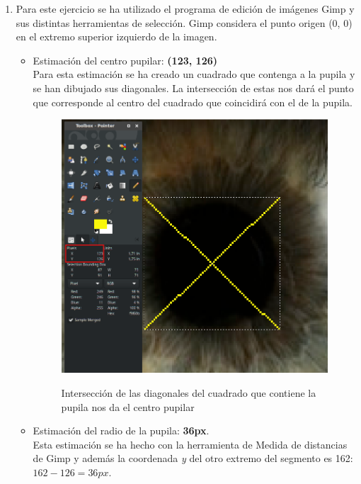 \documentclass[10pt,a4paper]{article}
\begin{document}
\begin{enumerate}[label=\textbf{\alph*)}]
\item Para este ejercicio se ha utilizado el programa de edición de imágenes Gimp y sus distintas herramientas de selección. Gimp considera el punto origen (0, 0) en el extremo superior izquierdo de la imagen.
\begin{itemize}
\item Estimación del centro pupilar: \textbf{(123, 126)}\\
Para esta estimación se ha creado un cuadrado que contenga a la pupila y se han dibujado sus diagonales. La intersección de estas nos dará el punto que corresponde al centro del cuadrado que coincidirá con el de la pupila.
\begin{figure}[h!]
  \centering
  \includegraphics[scale=0.3]{eye1.png}\\
  \caption{Intersección de las diagonales del cuadrado que contiene la pupila nos da el centro pupilar}
  \label{fig:pupil}
\end{figure}
\pagebreak

\item Estimación del radio de la pupila: \textbf{36px}.\\
Esta estimación se ha hecho con la herramienta de Medida de distancias de Gimp y además la coordenada \textit{y} del otro extremo del segmento es 162: $162 - 126 = 36px$.


\end{itemize}
\end{enumerate}
\end{document}

